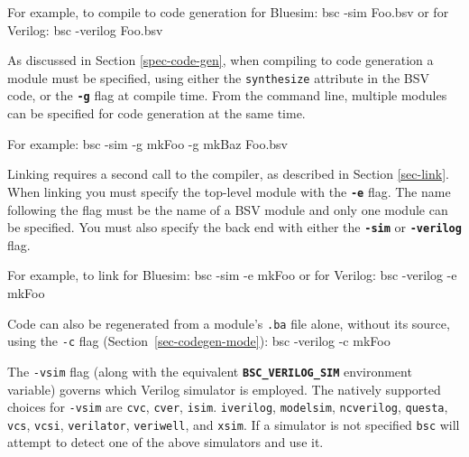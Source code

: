 \documentclass{article}
\newcommand{\te}[1]{\texttt{#1}}
\newenvironment{centerboxverbatim}
  {\center
   \boxedverbatim}
  {\endboxedverbatim
  {\endcenter }}
\begin{document}
For example, to compile to code generation for Bluesim:
\begin{centerboxverbatim}
bsc -sim Foo.bsv
\end{centerboxverbatim}
or for Verilog:
\begin{centerboxverbatim}
bsc -verilog Foo.bsv
\end{centerboxverbatim}

As discussed in Section \ref{spec-code-gen}, when compiling to
code generation  a module must be specified, using either  the \te{synthesize}
attribute in the BSV code, or  the {\bf\tt -g} flag at compile
time.  From the command line,
multiple modules can be specified for code generation at the same time.

For example:
\begin{centerboxverbatim}
bsc -sim -g mkFoo -g mkBaz Foo.bsv
\end{centerboxverbatim}

Linking requires a second call to the compiler, as described in
Section \ref{sec-link}.  When linking you must specify the
top-level module with the {\bf\tt -e} flag.  The name following the
flag must be the name of  a BSV module and only one module can be
specified.   You must also specify the back end with either the
{\bf\tt -sim}   or {\bf\tt -verilog} flag.

For example, to link for Bluesim:
\begin{centerboxverbatim}
bsc -sim -e mkFoo
\end{centerboxverbatim}
or for Verilog:
\begin{centerboxverbatim}
bsc -verilog -e mkFoo
\end{centerboxverbatim}

Code can also be regenerated from a module's \te{.ba} file alone,
without its source, using the \te{-c} flag
(Section~\ref{sec-codegen-mode}):
\begin{centerboxverbatim}
bsc -verilog -c mkFoo
\end{centerboxverbatim}


The \te{-vsim} flag
(along with the equivalent
\textbf{\texttt{BSC\_VERILOG\_SIM}} environment variable) governs which Verilog
simulator is employed.  The natively supported  choices for
\te{-vsim} are
\te{cvc},
\te{cver},
\te{isim}.
\te{iverilog},
\te{modelsim},
\te{ncverilog},
\te{questa},
\te{vcs},
\te{vcsi},
\te{verilator},
\te{veriwell},
and \te{xsim}.
If a simulator is not specified \te{bsc} will attempt to detect one
of the above simulators and use it.
\end{document}
